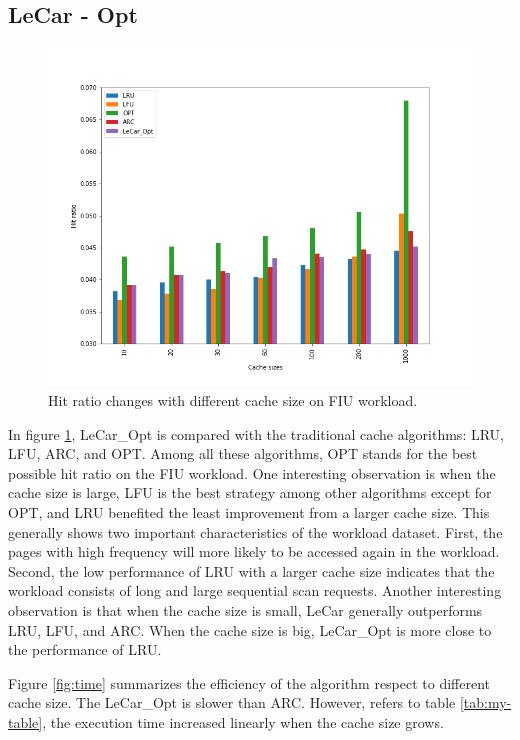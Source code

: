 \documentclass[letterpaper,twocolumn,10pt]{article}
\begin{document}
\subsection{LeCar - Opt}
\begin{figure}[!ht]
	\centering 
	\includegraphics[width=0.38\textheight]{hitratio_bar.png}
	\caption{Hit ratio changes with different cache size on FIU workload.
}
	\label{fig:lecar_res}
\end{figure}
In figure \ref{fig:lecar_res}, LeCar\_Opt is compared with the traditional cache algorithms: LRU, LFU, ARC, and OPT. Among all these algorithms, OPT stands for the best possible hit ratio on the FIU workload. One interesting observation is when the cache size is large, LFU is the best strategy among other algorithms except for OPT, and LRU benefited the least improvement from a larger cache size. This generally shows two important characteristics of the workload dataset. First, the pages with high frequency will more likely to be accessed again in the workload. Second, the low performance of LRU with a larger cache size indicates that the workload consists of long and large sequential scan requests. Another interesting observation is that when the cache size is small, LeCar generally outperforms LRU, LFU, and ARC. When the cache size is big, LeCar\_Opt is more close to the performance of LRU. 

Figure \ref{fig:time} summarizes the efficiency of the algorithm respect to different cache size. The LeCar\_Opt is slower than ARC. However, refers to table \ref{tab:my-table}, the execution time increased linearly when the cache size grows.
\end{document}
